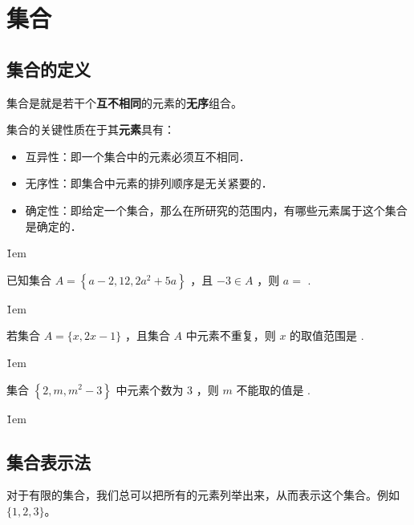 \section{集合}

\subsection{集合的定义}

\begin{definition}[集合]
    集合是就是若干个\textbf{互不相同}的元素的\textbf{无序}组合。
\end{definition}

集合的关键性质在于其\textbf{元素}具有：

\begin{itemize}
    \item 互异性：即一个集合中的元素必须互不相同．
    \item 无序性：即集合中元素的排列顺序是无关紧要的．
    \item 确定性：即给定一个集合，那么在所研究的范围内，有哪些元素属于这个集合是确定的．
\end{itemize}

\v{1em}

\begin{example}
    已知集合 $A=\left\{a-2,12,2 a^2+5 a\right\}$ ，且 $-3 \in A$ ，则 $a=$ \underline{\qquad}.
\end{example}

\v{1em}

\begin{example}
    若集合 $A=\{x, 2 x-1\}$ ，且集合 $A$ 中元素不重复，则 $x$ 的取值范围是 \underline{\qquad}.
\end{example}

\v{1em}

\begin{example}
    集合 $\left\{2, m, m^2-3\right\}$ 中元素个数为 3 ，则 $m$ 不能取的值是 \underline{\qquad}.
\end{example}

\v{1em}

\subsection{集合表示法}

\begin{definition}[列举法]
    对于有限的集合，我们总可以把所有的元素列举出来，从而表示这个集合。例如$\{1,2,3\}$。
\end{definition}

